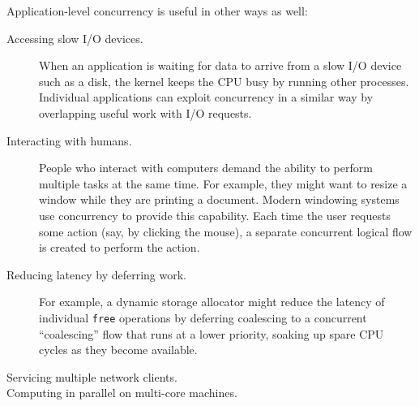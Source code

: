 \documentclass[11pt]{article}
\begin{document}
Application-level concurrency is useful in other ways as well:\\
\begin{description}
\item[{Accessing slow I/O devices.}] When an application is waiting for data to arrive from a slow I/O device such as a disk, the kernel keeps the CPU busy by running other processes. Individual applications can exploit concurrency in a similar way by overlapping useful work with I/O requests.\\
\item[{Interacting with humans.}] People who interact with computers demand the ability to perform multiple tasks at the same time. For example, they might want to resize a window while they are printing a document. Modern windowing systems use concurrency to provide this capability. Each time the user requests some action (say, by clicking the mouse), a separate concurrent logical flow is created to perform the action.\\
\item[{Reducing latency by deferring work.}] For example, a dynamic storage allocator might reduce the latency of individual \texttt{free} operations by deferring coalescing to a concurrent “coalescing” flow that runs at a lower priority, soaking up spare CPU cycles as they become available.\\
\item[{Servicing multiple network clients. }] 

\item[{Computing in parallel on multi-core machines.}] 
\end{description}
\end{document}
